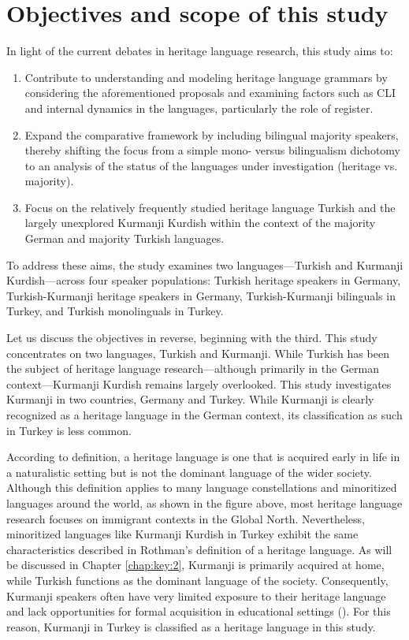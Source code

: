 \section{Objectives and scope of this study}\label{sec:key:1.2}

In light of the current debates in heritage language research, this study aims to:

\begin{enumerate}
    \item Contribute to understanding and modeling heritage language grammars by considering the aforementioned proposals and examining factors such as CLI and internal dynamics in the languages, particularly the role of register.
    \item Expand the comparative framework by including bilingual majority speakers, thereby shifting the focus from a simple mono- versus bilingualism dichotomy to an analysis of the status of the languages under investigation (heritage vs. majority).
    \item Focus on the relatively frequently studied heritage language Turkish and the largely unexplored Kurmanji Kurdish within the context of the majority German and majority Turkish languages.
\end{enumerate}

To address these aims, the study examines two languages—Turkish and Kurmanji Kurdish—across four speaker populations: Turkish heritage speakers in Germany, Turkish-Kurmanji heritage speakers in Germany, Turkish-Kurmanji bilinguals in Turkey, and Turkish monolinguals in Turkey.

Let us discuss the objectives in reverse, beginning with the third. This study concentrates on two languages, Turkish and Kurmanji. While Turkish has been the subject of heritage language research—although primarily in the German context—Kurmanji Kurdish remains largely overlooked. This study investigates Kurmanji in two countries, Germany and Turkey. While Kurmanji is clearly recognized as a heritage language in the German context, its classification as such in Turkey is less common.

According to  definition, a heritage language is one that is acquired early in life in a naturalistic setting but is not the dominant language of the wider society. Although this definition applies to many language constellations and minoritized languages around the world, as shown in the figure above, most heritage language research focuses on immigrant contexts in the Global North. Nevertheless, minoritized languages like Kurmanji Kurdish in Turkey exhibit the same characteristics described in Rothman’s definition of a heritage language. As will be discussed in Chapter \ref{chap:key:2}, Kurmanji is primarily acquired at home, while Turkish functions as the dominant language of the society. Consequently, Kurmanji speakers often have very limited exposure to their heritage language and lack opportunities for formal acquisition in educational settings (\citealt{BulutOpengin2018}). For this reason, Kurmanji in Turkey is classified as a heritage language in this study.

